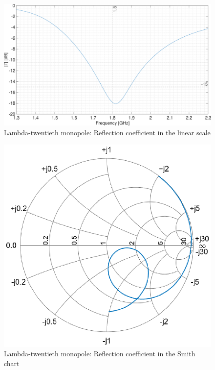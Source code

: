 \documentclass[11pt,a4paper]{article}
\begin{document}
        \begin{figure}[!ht]
            \centering
            \includegraphics[width=.8\textwidth]{src/lambda-twentieth-reflection-linear.eps}
            \caption{\label{fig:lambda-twentieth-reflection-linear}Lambda-twentieth monopole: Reflection coefficient in the linear scale}
        \end{figure}
        
        \begin{figure}[!ht]
            \centering
            \includegraphics[width=.8\textwidth]{src/lambda-twentieth-reflection-smith.eps}
            \caption{\label{fig:lambda-twentieth-reflection-smith}Lambda-twentieth monopole: Reflection coefficient in the Smith chart}
        \end{figure}
\end{document}
